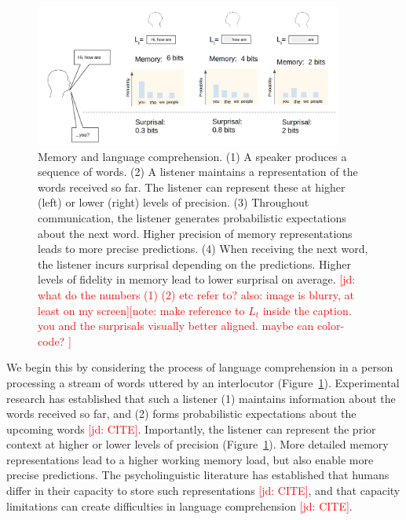 \documentclass[12pt]{article}
\newcommand{\jd}[1]{\textcolor{Red}{[jd: #1]}}
\newcommand{\note}[1]{\textcolor{Red}{[note: #1]}}
\begin{document}
\begin{figure}
\centering
\includegraphics[width=0.9\textwidth]{figures-gdrive/communication.png}
	\caption{Memory and language comprehension. (1) A speaker produces a sequence of words. (2) A listener maintains a representation of the words received so far. The listener can represent these at higher (left) or lower (right) levels of precision. (3) Throughout communication, the listener generates probabilistic expectations about the next word. Higher precision of memory representations leads to more precise predictions. (4) When receiving the next word, the listener incurs surprisal depending on the predictions. Higher levels of fidelity in memory lead to lower surprisal on average. \jd{what do the numbers (1) (2) etc refer to? also: image is blurry, at least on my screen}\note{make reference to $L_t$ inside the caption. you and the surprisals visually better aligned. maybe can color-code? }}
	\label{fig:communication}
\end{figure}

We begin this by considering the process of language comprehension in a person processing a stream of words uttered by an interlocutor (Figure~\ref{fig:communication}).
Experimental research has established that such a listener (1) maintains information about the words received so far, and (2) forms probabilistic expectations about the upcoming words \jd{CITE}. %
Importantly, the listener can represent the prior context at higher or lower levels of precision (Figure~\ref{fig:communication}).
More detailed memory representations lead to a higher working memory load, but also enable more precise predictions.
The psycholinguistic literature has established that humans differ in their capacity to store such representations \jd{CITE}, and that capacity limitations can create difficulties in language comprehension \jd{CITE}.
\end{document}

